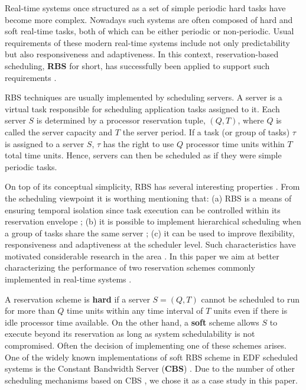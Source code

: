 \documentclass[12pt]{article}
\begin{document}
Real-time systems once structured as a set of simple periodic hard
tasks \cite{liu.ea73:scheduling} have become more complex. Nowadays
such systems are often composed of hard and soft real-time tasks, both
of which can be either periodic or non-periodic.  Usual requirements
of these modern real-time systems include not only predictability but
also responsiveness and adaptiveness. In this context,
reservation-based scheduling, \textbf{RBS} for short, has successfully
been applied to support such requirements
\cite{abeni.ea04:resource,mercer.ea94:processor,rajkumar.ea98:resource,sprunt.ea89:aperiodic,steffens.ea03:resource}.

RBS techniques are usually implemented by scheduling servers. A server
is a virtual task responsible for scheduling application tasks
assigned to it.  Each server $S$ is determined by a processor
reservation tuple, $(Q,T)$, where $Q$ is called the server capacity
and $T$ the server period.  If a task (or group of tasks) $\tau$ is
assigned to a server $S$, $\tau$ has the right to use $Q$ processor
time units within $T$ total time units. Hence, servers can then be
scheduled as if they were simple periodic tasks.

On top of its conceptual simplicity, RBS has several interesting
properties \cite{steffens.ea03:resource}. From the scheduling
viewpoint it is worthing mentioning that: (a) RBS is a means of
ensuring temporal isolation since task execution can be controlled
within its reservation envelope
\cite{abeni.ea04:resource,mercer.ea94:processor,sprunt.ea89:aperiodic,spuri.ea96:scheduling};
(b) it is possible to implement hierarchical scheduling when a group
of tasks share the same server
\cite{davis.ea05:hierarchical,davis.ea08:investigation}; (c) it can be
used to improve flexibility, responsiveness and adaptiveness at the
scheduler level.  Such characteristics have motivated considerable
research in the area
\cite{abeni.ea99:adaptive,caccamo.ea00:capacity,caccamo.ea05:efficient,oliveira.ea08:dynamic,oliveira.ea09:dynamic,lin.ea05:improving}.
In this paper we aim at better characterizing the performance of two
reservation schemes commonly implemented in real-time systems
\cite{perng.ea06:real}.

A reservation scheme is \textbf{hard} if a server $S = (Q,T)$ cannot
be scheduled to run for more than $Q$ time units within any time
interval of $T$ units even if there is idle processor time
available. On the other hand, a \textbf{soft} scheme allows $S$ to
execute beyond its reservation as long as system schedulability is not
compromised. Often the decision of implementing one of these schemes
arises. One of the widely known implementations of soft RBS scheme in
EDF scheduled systems is the Constant Bandwidth Server (\textbf{CBS})
\cite{abeni.ea04:resource}.  Due to the number of other scheduling
mechanisms based on CBS
\cite{abeni.ea05:qos,caccamo.ea00:capacity,caccamo.ea05:efficient,lipari.ea00:greedy},
we chose it as a case study in this paper.
\end{document}
